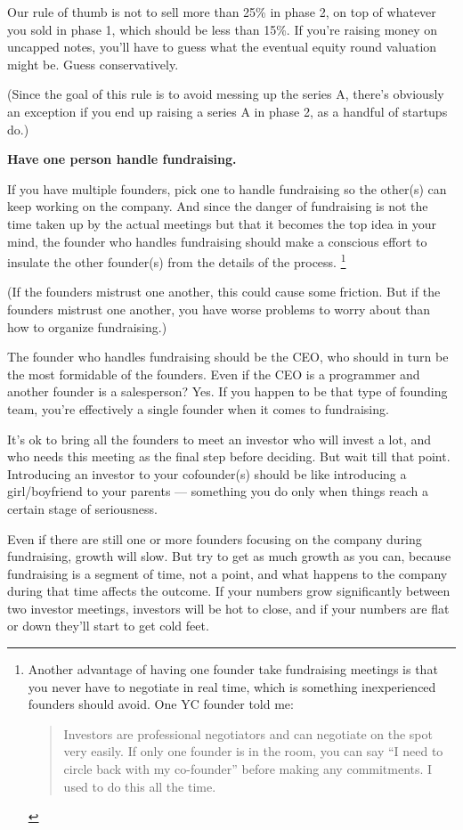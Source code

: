 \documentclass[12pt]{book}
\begin{document}
Our rule of thumb is not to sell more than 25\% in phase 2, on top of
whatever you sold in phase 1, which should be less than 15\%. If you're
raising money on uncapped notes, you'll have to guess what the eventual
equity round valuation might be. Guess conservatively.

(Since the goal of this rule is to avoid messing up the series A,
there's obviously an exception if you end up raising a series A in phase
2, as a handful of startups do.)

\textbf{Have one person handle fundraising.}

If you have multiple founders, pick one to handle fundraising so the
other(s) can keep working on the company. And since the danger of
fundraising is not the time taken up by the actual meetings but that it
becomes the top idea in your mind, the founder who handles fundraising
should make a conscious effort to insulate the other founder(s) from the
details of the process. \footnote{Another advantage of having one founder take fundraising
meetings is that you never have to negotiate in real time, which is
something inexperienced founders should avoid. One YC founder told me:

\begin{quote}
Investors are professional negotiators and can negotiate on the spot
very easily. If only one founder is in the room, you can say ``I need to
circle back with my co-founder'' before making any commitments. I used
to do this all the time.
\end{quote}}

(If the founders mistrust one another, this could cause some friction.
But if the founders mistrust one another, you have worse problems to
worry about than how to organize fundraising.)

The founder who handles fundraising should be the CEO, who should in
turn be the most formidable of the founders. Even if the CEO is a
programmer and another founder is a salesperson? Yes. If you happen to
be that type of founding team, you're effectively a single founder when
it comes to fundraising.

It's ok to bring all the founders to meet an investor who will invest a
lot, and who needs this meeting as the final step before deciding. But
wait till that point. Introducing an investor to your cofounder(s)
should be like introducing a girl/boyfriend to your parents ---
something you do only when things reach a certain stage of seriousness.

Even if there are still one or more founders focusing on the company
during fundraising, growth will slow. But try to get as much growth as
you can, because fundraising is a segment of time, not a point, and what
happens to the company during that time affects the outcome. If your
numbers grow significantly between two investor meetings, investors will
be hot to close, and if your numbers are flat or down they'll start to
get cold feet.
\end{document}
